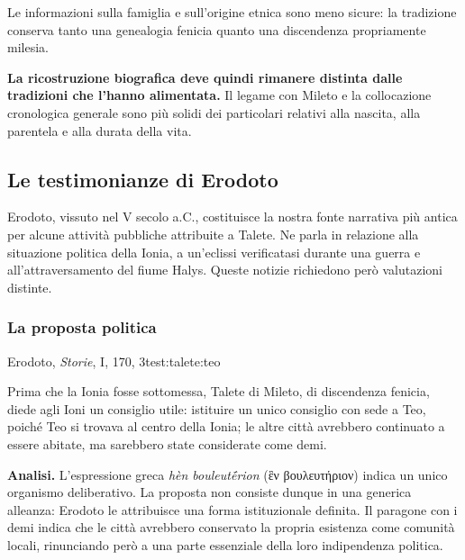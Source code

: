 Le informazioni sulla famiglia e sull'origine etnica sono meno sicure: la tradizione conserva tanto una genealogia fenicia quanto una discendenza propriamente milesia.

\textbf{La ricostruzione biografica deve quindi rimanere distinta dalle tradizioni che l'hanno alimentata.} Il legame con Mileto e la collocazione cronologica generale sono più solidi dei particolari relativi alla nascita, alla parentela e alla durata della vita.

\subsection{Le testimonianze di Erodoto}

Erodoto, vissuto nel V secolo a.C., costituisce la nostra fonte narrativa più antica per alcune attività pubbliche attribuite a Talete. Ne parla in relazione alla situazione politica della Ionia, a un'eclissi verificatasi durante una guerra e all'attraversamento del fiume Halys. Queste notizie richiedono però valutazioni distinte.

\subsubsection{La proposta politica}

\begin{testimonianza}{Erodoto, \emph{Storie}, I, 170, 3}{test:talete:teo}
\smallskip
{}\par
Prima che la Ionia fosse sottomessa, Talete di Mileto, di discendenza fenicia, diede agli Ioni un consiglio utile: istituire un unico consiglio con sede a Teo, poiché Teo si trovava al centro della Ionia; le altre città avrebbero continuato a essere abitate, ma sarebbero state considerate come demi.
\end{testimonianza}



\noindent\textbf{Analisi.}
L'espressione greca \emph{hèn bouleutḗrion} (ἓν βουλευτήριον) indica un unico organismo deliberativo. La proposta non consiste dunque in una generica alleanza: Erodoto le attribuisce una forma istituzionale definita. Il paragone con i demi indica che le città avrebbero conservato la propria esistenza come comunità locali, rinunciando però a una parte essenziale della loro indipendenza politica.

